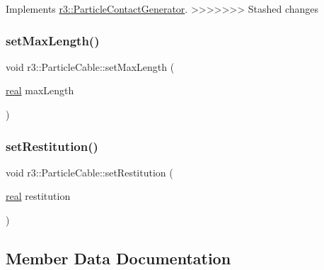 Implements \mbox{\hyperlink{classr3_1_1_particle_contact_generator_a39a7a8f0d5b31b1ca2c2ace2af8e2978}{r3\+::\+Particle\+Contact\+Generator}}.
>>>>>>> Stashed changes

\mbox{\label{classr3_1_1_particle_cable_a6cf3d6cff00fa5a7eeb1df8975cd59de}} 
\subsubsection{\texorpdfstring{set\+Max\+Length()}{setMaxLength()}}
{\footnotesize\ttfamily void r3\+::\+Particle\+Cable\+::set\+Max\+Length (\begin{DoxyParamCaption}\item[{\mbox{\hyperlink{namespacer3_ab2016b3e3f743fb735afce242f0dc1eb}{real}}}]{max\+Length }\end{DoxyParamCaption})}

\mbox{\label{classr3_1_1_particle_cable_a070f8df68fbf2b7a7b758f1c5b22c42c}} 
\subsubsection{\texorpdfstring{set\+Restitution()}{setRestitution()}}
{\footnotesize\ttfamily void r3\+::\+Particle\+Cable\+::set\+Restitution (\begin{DoxyParamCaption}\item[{\mbox{\hyperlink{namespacer3_ab2016b3e3f743fb735afce242f0dc1eb}{real}}}]{restitution }\end{DoxyParamCaption})}



\subsection{Member Data Documentation}
\mbox{\label{classr3_1_1_particle_cable_a168d7ed5047dc94ae73f7eec4929ab4d}} 

